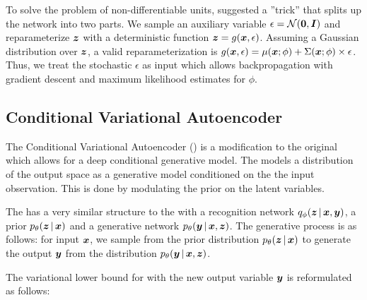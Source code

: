 To solve the problem of non-differentiable units, \parencite{kingma2013auto} suggested a ''trick'' that splits up the network into two parts. We sample an auxiliary variable $\epsilon = \mathcal{N}(\boldsymbol{0}, \boldsymbol{I})$ and reparameterize $\boldsymbol{z}$ with a deterministic function $\boldsymbol{z}=g(\boldsymbol{x}, \epsilon)$. Assuming a Gaussian distribution over $\boldsymbol{z}$, a valid reparameterization is $g(\boldsymbol{x}, \epsilon) = \mu(\boldsymbol{x}; \phi) + \Sigma(\boldsymbol{x}; \phi) \times \epsilon$.
Thus, we treat the stochastic $\epsilon$ as input which allows backpropagation with gradient descent and maximum likelihood estimates for $\phi$.


\subsection{Conditional Variational Autoencoder}

The Conditional Variational Autoencoder (\cvae{}) is a modification to the original \vae{} which allows for a deep conditional generative model. The \cvae{} models a distribution of the output space as a generative model conditioned on the the input observation. This is done by modulating the prior on the latent variables.

The \cvae{} has a very similar structure to the \vae{} with a recognition network $\qphi \given{\vz}{\vx, \vy}$, a prior $\ptheta \given{\vz}{\vx}$ and a generative network $p_{\theta}\given{\vy}{\vx, \vz}$. The generative process is as follows: for input $\boldsymbol{x}$, we sample from the prior distribution $\ptheta \given{\vz}{\vx}$ to generate the output $\boldsymbol{y}$ from the distribution $\ptheta \given{\vy}{\vx, \vz}$.


The variational lower bound for \cvae{} with the new output variable $\boldsymbol{y}$ is reformulated as follows:


